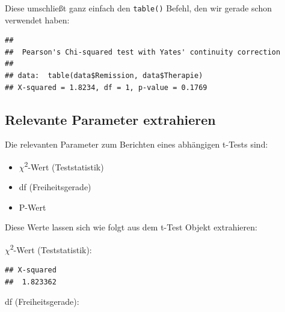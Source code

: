 \documentclass[
]{book}
\newenvironment{Shaded}{\begin{snugshade}}{\end{snugshade}}
\newcommand{\FunctionTok}[1]{\textcolor[rgb]{0.00,0.00,0.00}{#1}}
\newcommand{\NormalTok}[1]{#1}
\newcommand{\SpecialCharTok}[1]{\textcolor[rgb]{0.00,0.00,0.00}{#1}}
\providecommand{\tightlist}{%
  \setlength{\itemsep}{0pt}\setlength{\parskip}{0pt}}
\begin{document}
Diese umschließt ganz einfach den \texttt{table()} Befehl, den wir gerade schon verwendet haben:

\begin{Shaded}
\end{Shaded}

\begin{verbatim}
## 
##  Pearson's Chi-squared test with Yates' continuity correction
## 
## data:  table(data$Remission, data$Therapie)
## X-squared = 1.8234, df = 1, p-value = 0.1769
\end{verbatim}

\hypertarget{relevante-parameter-extrahieren-4}{%
\subsection{Relevante Parameter extrahieren}\label{relevante-parameter-extrahieren-4}}

Die relevanten Parameter zum Berichten eines abhängigen t-Tests sind:

\begin{itemize}
\tightlist
\item
  \(\chi\)\textsuperscript{2}-Wert (Teststatistik)
\item
  df (Freiheitsgerade)
\item
  P-Wert
\end{itemize}

Diese Werte lassen sich wie folgt aus dem t-Test Objekt extrahieren:

\(\chi\)\textsuperscript{2}-Wert (Teststatistik):

\begin{Shaded}
\end{Shaded}

\begin{verbatim}
## X-squared 
##  1.823362
\end{verbatim}

df (Freiheitsgerade):
\end{document}
